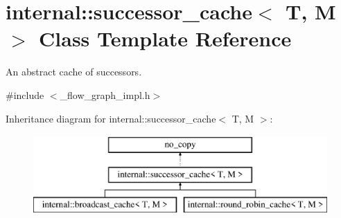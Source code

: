 \hypertarget{classinternal_1_1successor__cache}{}\section{internal\+:\+:successor\+\_\+cache$<$ T, M $>$ Class Template Reference}
\label{classinternal_1_1successor__cache}


An abstract cache of successors.  




{\ttfamily \#include $<$\+\_\+flow\+\_\+graph\+\_\+impl.\+h$>$}

Inheritance diagram for internal\+:\+:successor\+\_\+cache$<$ T, M $>$\+:\begin{figure}[H]
\begin{center}
\leavevmode
\includegraphics[height=3.000000cm]{classinternal_1_1successor__cache}
\end{center}
\end{figure}
